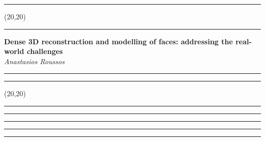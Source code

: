 \documentclass[11pt]{article}
\newcommand{\talk}[1]{\Large\flushleft\textbf{#1}\\}
\newcommand{\speaker}[1]{\textit{#1}\\}
\newcommand{\separator}{\noindent\rule{\linewidth}{0.1mm}}
\newcommand{\votebox}{\vspace{-5cm}\noindent\hfill\framebox(20,20){}}
\newcommand{\hstrut}{\noindent\color{iclightblue}\rule{\linewidth}{0pt}}
\begin{document}
\begin{minipage}[b]{0.02\linewidth}
\hstrut%
\end{minipage}
\begin{minipage}[b]{0.49\linewidth}
\votebox%
\end{minipage}
\noindent
\begin{minipage}[t]{0.49\linewidth}
\separator%
\talk{Dense 3D reconstruction and modelling of faces: addressing the real-world
      challenges}
\speaker{Anastasios Roussos}
\end{minipage}
\begin{minipage}[t]{0.02\linewidth}
\hstrut%
\end{minipage}
\begin{minipage}[t]{0.49\linewidth}
\separator%
\end{minipage}
\vfill
\noindent
\begin{minipage}[b]{0.49\linewidth}
\votebox%
\end{minipage}
\begin{minipage}[b]{0.02\linewidth}
\hstrut%
\end{minipage}
\begin{minipage}[b]{0.49\linewidth}
\hstrut%
\end{minipage}
\noindent
\begin{minipage}[t]{0.49\linewidth}
\separator%
\end{minipage}
\begin{minipage}[t]{0.02\linewidth}
\hstrut%
\end{minipage}
\begin{minipage}[t]{0.49\linewidth}
\hstrut%
\end{minipage}
\end{document}
